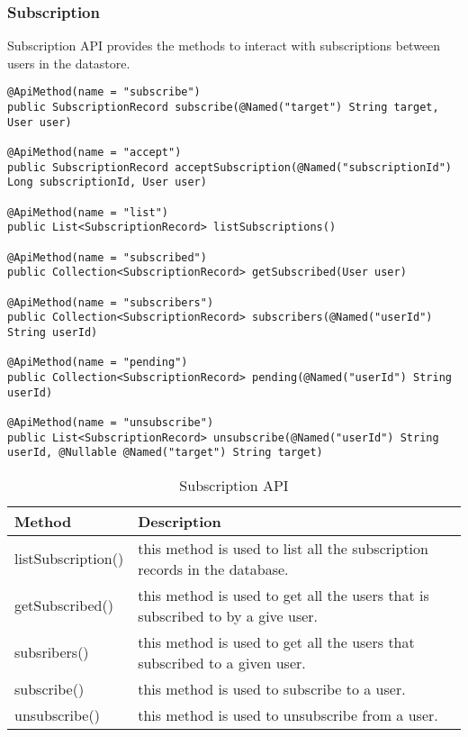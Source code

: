 \subsubsection{Subscription}
Subscription API provides the methods to interact with subscriptions between users in the datastore. \\
\begin{minipage}{\linewidth}
\begin{lstlisting}
@ApiMethod(name = "subscribe")
public SubscriptionRecord subscribe(@Named("target") String target, User user)

@ApiMethod(name = "accept")
public SubscriptionRecord acceptSubscription(@Named("subscriptionId") Long subscriptionId, User user)

@ApiMethod(name = "list")
public List<SubscriptionRecord> listSubscriptions()

@ApiMethod(name = "subscribed")
public Collection<SubscriptionRecord> getSubscribed(User user)

@ApiMethod(name = "subscribers")
public Collection<SubscriptionRecord> subscribers(@Named("userId") String userId) 

@ApiMethod(name = "pending")
public Collection<SubscriptionRecord> pending(@Named("userId") String userId)

@ApiMethod(name = "unsubscribe")
public List<SubscriptionRecord> unsubscribe(@Named("userId") String userId, @Nullable @Named("target") String target)
\end{lstlisting}
\end{minipage}

\begin{table}
\begin{center}
    \begin{tabularx}{\textwidth}{| l | X |}
        \hline Method & Description \\
        \hline listSubscription() & 
            this method is used to list all the subscription records in the database. \\
        \hline getSubscribed() & 
            this method is used to get all the users that is subscribed to by a give user. \\
        \hline subsribers() & 
            this method is used to get all the users that subscribed to a given user. \\
        \hline subscribe() & 
            this method is used to subscribe to a user. \\
        \hline unsubscribe() & 
            this method is used to unsubscribe from a user. \\
        \hline
    \end{tabularx}
\end{center}
\caption{Subscription API}
\end{table}

